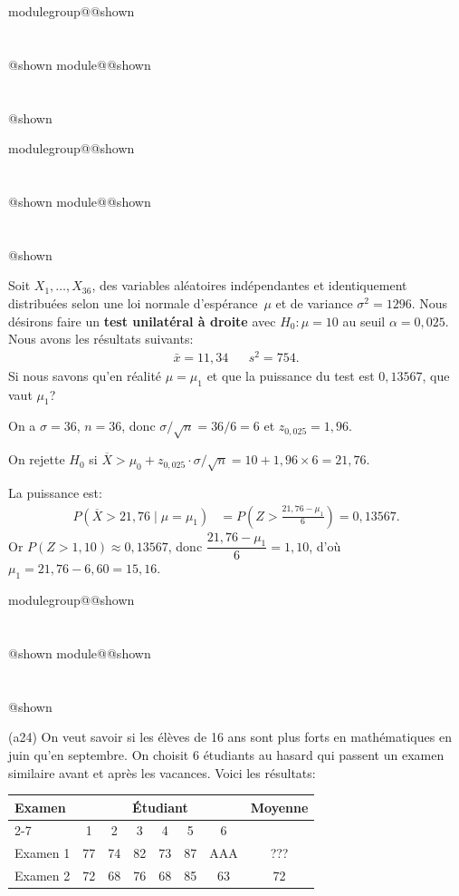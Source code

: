 \documentclass{Evaluation}
\makeatletter
\newcommand{\currentmodulekey}{}
\newcommand{\currentmoduletitle}{}
\newcommand{\currentgroupkey}{}
\newcommand{\currentgrouptitle}{}
\newcommand{\showmoduleifneeded}{%
  \ifx\currentgroupkey\empty\else
    \expandafter\ifx\csname modulegroup@\currentgroupkey @shown\endcsname\relax
      \section*{\currentgrouptitle}%
      \expandafter\gdef\csname modulegroup@\currentgroupkey @shown\endcsname{1}%
    \fi
  \fi
  \expandafter\ifx\csname module@\currentmodulekey @shown\endcsname\relax
    \section*{\currentmoduletitle}%
    \expandafter\gdef\csname module@\currentmodulekey @shown\endcsname{1}%
  \fi
}
\newenvironment{H24}{\showmoduleifneeded}{}
\newenvironment{A24}{\showmoduleifneeded}{}
\makeatother
\begin{document}
\begin{questions}
\begin{H24}
\begin{parts}
\end{parts}
\end{H24}

\begin{H24}
\question {} %
Soit $X_1,\hdots, X_{36}$, des variables aléatoires indépendantes et identiquement distribuées selon une loi normale d'espérance~$\mu$ et de variance $\sigma^2=1296$.
Nous désirons faire un \textbf{test unilatéral à droite} avec $H_0:\mu=10$ au seuil $\alpha = 0,025$.
Nous avons les résultats suivants:
\begin{align*}
    \bar{x}= 11,34 &  & s^2=754.
\end{align*}
Si nous savons qu'en réalité $\mu=\mu_1$ et que la puissance du test est $0,13567$, que vaut $\mu_1$?

\begin{solution}
On a $\sigma = 36$, $n = 36$, donc $\sigma/\sqrt{n} = 36/6 = 6$ et $z_{0{,}025} = 1{,}96$.

On rejette $H_0$ si $\overline{X} > \mu_0 + z_{0{,}025} \cdot \sigma/\sqrt{n} = 10 + 1{,}96 \times 6 = 21{,}76$.

La puissance est:
\begin{align*}
P(\overline{X} > 21{,}76 \mid \mu = \mu_1) &= P\!\left(Z > \frac{21{,}76 - \mu_1}{6}\right) = 0{,}13567.
\end{align*}
Or $P(Z > 1{,}10) \approx 0{,}13567$, donc $\dfrac{21{,}76 - \mu_1}{6} = 1{,}10$, d'où $\mu_1 = 21{,}76 - 6{,}60 = 15{,}16$.
\end{solution}
\end{H24}

\begin{A24}
\question {}
(a24)
On veut savoir si les élèves de 16 ans sont plus forts en mathématiques en juin qu’en septembre.
On choisit 6 étudiants au hasard qui passent un examen similaire avant et après les vacances.
Voici les résultats:
\begin{center}
\renewcommand{\arraystretch}{1.5}
    \begin{tabular}{|l|cccccc|c|}
        \hline
        \multirow{2}{*}{Examen} & \multicolumn{6}{c|}{Étudiant} & \multirow{2}{*}{Moyenne} \\
        \cline{2-7}
         & 1 & 2 & 3 & 4 & 5 & 6 & \\
        \hline
        Examen 1 & 77 & 74 & 82 & 73 & 87 & AAA & ??? \\
        Examen 2 & 72 & 68 & 76 & 68 & 85 & 63 & 72\\
        \hline
    \end{tabular}
\end{center}


\end{A24}
\end{questions}
\end{document}
